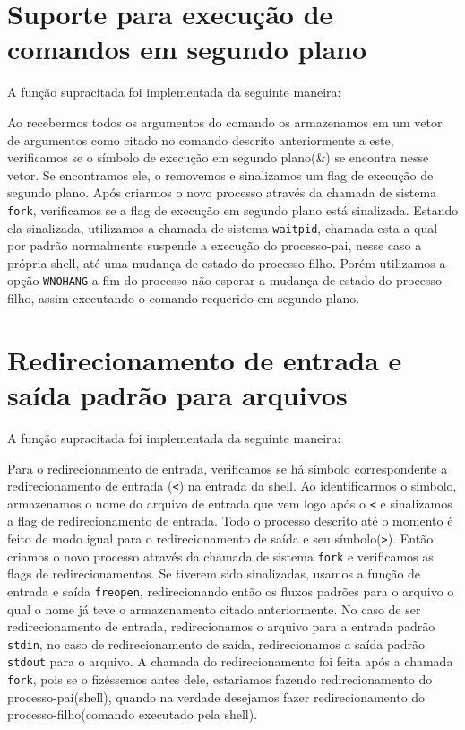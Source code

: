 \documentclass[12pt]{article}
\begin{document}
\section*{Suporte para execução de comandos em segundo plano}
A função supracitada foi implementada da seguinte maneira:

Ao recebermos todos os argumentos do comando os armazenamos em um vetor de argumentos como citado no comando descrito anteriormente a este, verificamos se o símbolo de execução em segundo plano(\&) se encontra nesse vetor.
Se encontramos ele, o removemos e sinalizamos um flag de execução de segundo plano.
Após criarmos o novo processo através da chamada de sistema \texttt{fork},
verificamos se a flag de execução em segundo plano está sinalizada.
Estando ela sinalizada, utilizamos a chamada de sistema \texttt{waitpid},
chamada esta a qual por padrão normalmente suspende a execução do processo-pai,
nesse caso a própria shell, até uma mudança de estado do processo-filho.
Porém utilizamos a opção \texttt{WNOHANG} a fim do processo não esperar
a mudança de estado do processo-filho, assim executando o comando requerido em segundo plano.

\section*{Redirecionamento de entrada e saída padrão para arquivos}
A função supracitada foi implementada da seguinte maneira:

Para o redirecionamento de entrada, verificamos se há símbolo correspondente a redirecionamento de entrada (\texttt{<})
na entrada da shell.
Ao identificarmos o símbolo, armazenamos o nome do arquivo de entrada que vem logo após o \texttt{<}
e sinalizamos a flag de redirecionamento de entrada.
Todo o processo descrito até o momento é feito de modo igual para o redirecionamento de saída e seu símbolo(\texttt{>}).
Então criamos o novo processo através da chamada de sistema \texttt{fork}
e verificamos as flags de redirecionamentos.
Se tiverem sido sinalizadas, usamos a função de entrada e saída
\texttt{freopen}, redirecionando então os fluxos padrões para o arquivo o qual o nome já teve o armazenamento citado anteriormente.
No caso de ser redirecionamento de entrada, redirecionamos o arquivo para a entrada padrão \texttt{stdin},
no caso de redirecionamento de saída, redirecionamos a saída padrão \texttt{stdout} para o arquivo.
A chamada do redirecionamento foi feita após a chamada \texttt{fork},
pois se o fizéssemos antes dele, estariamos fazendo redirecionamento do processo-pai(shell),
quando na verdade desejamos fazer redirecionamento do processo-filho(comando executado pela shell).
\end{document}
